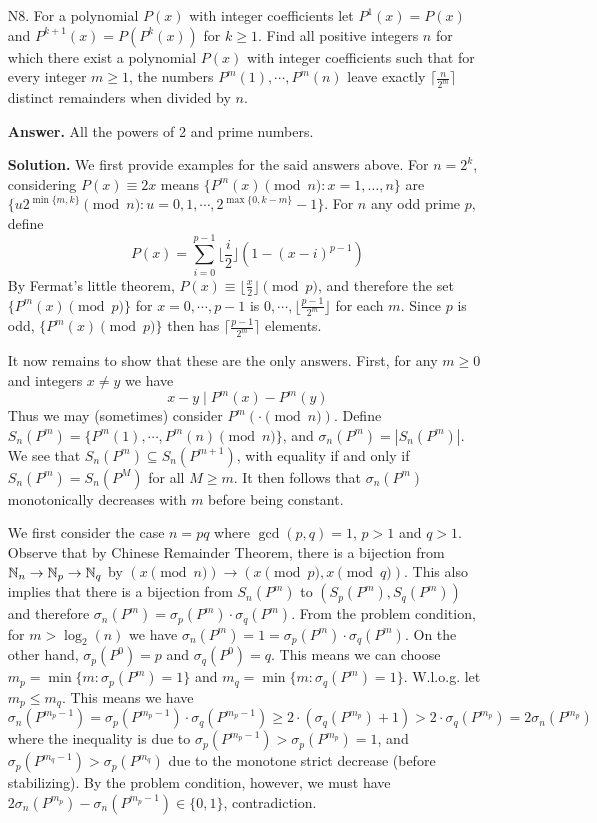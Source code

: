 \documentclass[11pt,a4paper]{article}
\begin{document}
\begin{enumerate}
	    
	    \item [N8.]
	    For a polynomial $P(x)$ with integer coefficients let $P^{1}(x) = P(x)$ and $P^{k+1}(x) = P(P^k(x))$ for $k \ge 1$. 
	    Find all positive integers $n$ for which there exist a polynomial $P(x)$ with integer coefficients such that for every integer $m \ge 1$, 
	    the numbers $P^m(1), \cdots, P^ m(n)$ leave exactly $\lceil \frac{n}{2^m}\rceil$ distinct remainders when divided by $n$. 
	    
	    \textbf{Answer.} All the powers of 2 and prime numbers. 
	    
	    \textbf{Solution.} 
	    We first provide examples for the said answers above. 
	    For $n=2^k$, considering $P(x)\equiv 2x$ means $\{P^{m}(x)\pmod{n}: x=1, \dots, n\}$ 
	    are $\{u2^{\min\{m, k\}}\pmod{n}: u=0, 1, \cdots, 2^{\max\{0, k - m\}} - 1\}$. 
	    For $n$ any odd prime $p$, 
	    define 
	    \[
	    P(x) = \sum_{i=0}^{p-1} \lfloor \frac{i}{2}\rfloor (1 - (x-i)^{p-1})
	    \]
	    By Fermat's little theorem, $P(x)\equiv \lfloor \frac{x}{2}\rfloor\pmod{p}$, 
	    and therefore the set $\{P^m(x)\pmod{p}\}$ for $x=0, \cdots, p-1$ is $0, \cdots, \lfloor \frac{p-1}{2^m}\rfloor$ for each $m$. 
	    Since $p$ is odd, $\{P^m(x)\pmod{p}\}$ then has $\lceil \frac{p-1}{2^m}\rceil$ elements. 
	    
	    It now remains to show that these are the only answers. First, for any $m\ge 0$ and integers $x\neq y$ we have 
	    \[
	    x-y\mid P^m(x)-P^m(y)
	    \]
	    Thus we may (sometimes) consider $P^m(\cdot \pmod{n})$. 
	    Define $S_n(P^m)=\{P^{m}(1), \cdots, P^{m}(n)\pmod{n}\}$, and $\sigma_n(P^m)=|S_n(P^m)|$.
	    We see that $S_n(P^m)\subseteq S_n(P^{m+1})$, 
	    with equality if and only if $S_n(P^m)=S_n(P^M)$ for all $M\ge m$. 
	    It then follows that $\sigma_n(P^m)$ monotonically decreases with $m$ before being constant. 
	    
	    We first consider the case $n=pq$ where $\gcd(p, q)=1$, $p > 1$ and $q > 1$. 
	    Observe that by Chinese Remainder Theorem, there is a bijection from ${\mathbb N}_{n}\to{\mathbb N}_{p}\to{\mathbb N}_{q}$ by $(x\pmod{n})\to(x\pmod{p}, x\pmod{q})$. 
	    This also implies that there is a bijection from $S_n(P^m)$ to $(S_p(P^m), S_q(P^m))$ and therefore 
	    $\sigma_n(P^m) = \sigma_p(P^m)\cdot \sigma_q(P^m)$. 
	    From the problem condition, for $m > \log_2(n)$ we have $\sigma_n(P^m) = 1 = \sigma_p(P^m)\cdot \sigma_q(P^m)$. 
	    On the other hand, $\sigma_p(P^0) = p$ and $\sigma_q(P^0)=q$. 
	    This means we can choose $m_p=\min\{m:\sigma_p(P^m)=1\}$ and 
	    $m_q=\min\{m:\sigma_q(P^m)=1\}$. 
	    W.l.o.g. let $m_p\le m_q$.
	    This means we have 
	    \[
	    \sigma_n(P^{m_p - 1})
	    =\sigma_p(P^{m_p - 1})\cdot \sigma_q(P^{m_p - 1})
	    \ge 2\cdot (\sigma_q(P^{m_p}) + 1)
	    > 2\cdot \sigma_q(P^{m_p})
	    =2\sigma_n(P^{m_p})
	    \]
	    where the inequality is due to $\sigma_p(P^{m_p - 1}) > \sigma_p(P^{m_p}) = 1$, 
	    and $\sigma_p(P^{m_q - 1}) > \sigma_p(P^{m_q})$ due to the monotone strict decrease (before stabilizing). 
	    By the problem condition, 
	    however, we must have $2\sigma_n(P^{m_p}) - \sigma_n(P^{m_p - 1})\in \{0, 1\}$, 
	    contradiction. 
        

\end{enumerate}
\end{document}
